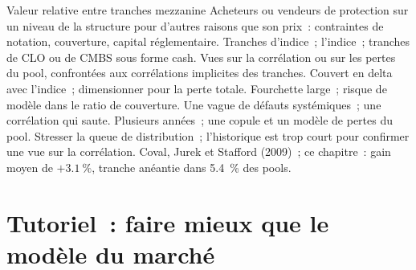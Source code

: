\begin{strategyfile}{Valeur relative entre tranches mezzanine}\label{strat:s2:mortgage-and-structured-credit-strategies:mezz}
 Acheteurs ou vendeurs de protection sur un niveau de la structure pour d'autres raisons que son prix~: contraintes de notation,
couverture, capital réglementaire.
 Tranches d'indice~; l'indice~; tranches de CLO ou de CMBS sous forme cash.
 Vues sur la corrélation ou sur les pertes du pool, confrontées aux corrélations implicites des tranches.
 Couvert en delta avec l'indice~; dimensionner pour la perte totale.
 Fourchette large~; risque de modèle dans le ratio de couverture.
 Une vague de défauts systémiques~; une corrélation qui saute.
 Plusieurs années~; une copule et un modèle de pertes du pool.
 Stresser la queue de distribution~; l'historique est trop court pour confirmer une vue sur la corrélation.
 Coval, Jurek et Stafford (2009)~; ce chapitre~: gain moyen de $+3.1~\%$, tranche anéantie dans 5.4~\% des pools.
\end{strategyfile}

\section{Tutoriel~: faire mieux que le modèle du marché}\label{tut:s2:mortgage-and-structured-credit-strategies:tut}

